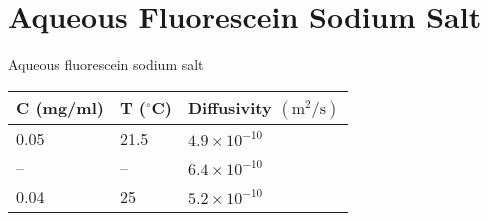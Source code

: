 \documentclass{beamer}
\begin{document}
\section*{Aqueous Fluorescein Sodium Salt}

\begin{frame}[c]{Aqueous fluorescein sodium salt}
	\centering\scriptsize
	\begin{minipage}{0.5\linewidth}
		\begin{cblock}{} \centering
			\renewcommand{\arraystretch}{1.25}	
			\begin{tabular}{lll}
				\toprule
				C (mg/ml) & T ($^\circ$C) & Diffusivity $(\mathrm{m^2/s})$ \\ 
				\midrule
				0.05      & 21.5          & $4.9\times 10^{-10}$           \\		
				--        & --            & $6.4\times 10^{-10}$           \\
				0.04      & 25            & $5.2\times 10^{-10}$           \\ 
				\bottomrule
			\end{tabular}
		\end{cblock}
	\end{minipage}
\end{frame}
	
\end{document}
